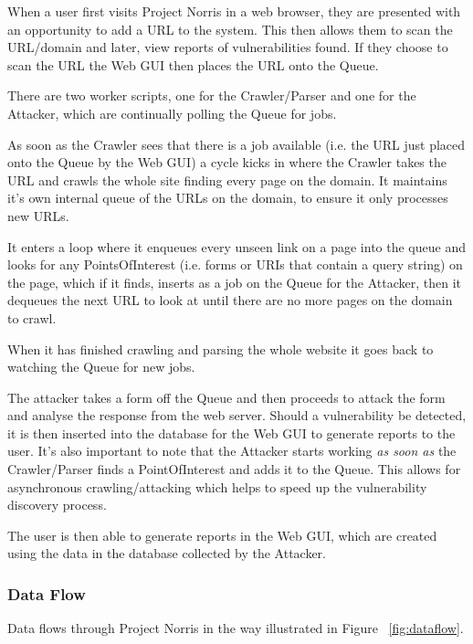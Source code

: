 \documentclass[12pt,a4paper]{article}
\begin{document}
When a user first visits Project Norris in a web browser, they are presented with an opportunity to add a URL to the system.  This then allows them to scan the URL/domain and later, view reports of vulnerabilities found.  If they choose to scan the URL the Web GUI then places the URL onto the Queue.

There are two worker scripts, one for the Crawler/Parser and one for the Attacker, which are continually polling the Queue for jobs.

As soon as the Crawler sees that there is a job available (i.e. the URL just placed onto the Queue by the Web GUI) a cycle kicks in where the Crawler takes the URL and crawls the whole site finding every page on the domain.  It maintains it’s own internal queue of the URLs on the domain, to ensure it only processes new URLs.

It enters a loop where it enqueues every unseen link on a page into the queue and looks for any PointsOfInterest (i.e. forms or URIs that contain a query string) on the page, which if it finds, inserts as a job on the Queue for the Attacker, then it dequeues the next URL to look at until there are no more pages on the domain to crawl.

When it has finished crawling and parsing the whole website it goes back to watching the Queue for new jobs.

The attacker takes a form off the Queue and then proceeds to attack the form and analyse the response from the web server.  Should a vulnerability be detected, it is then inserted into the database for the Web GUI to generate reports to the user.  It's also important to note that the Attacker starts working \emph{as soon as} the Crawler/Parser finds a PointOfInterest and adds it to the Queue.  This allows for asynchronous crawling/attacking which helps to speed up the vulnerability discovery process.

The user is then able to generate reports in the Web GUI, which are created using the data in the database collected by the Attacker.

\subsubsection{Data Flow}
Data flows through Project Norris in the way illustrated in Figure ~\ref{fig:dataflow}.
\end{document}
